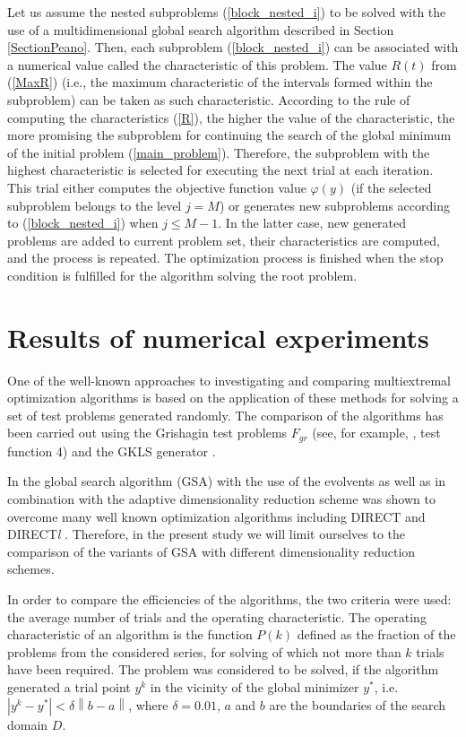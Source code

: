 \documentclass[runningheads]{llncs}
\begin{document}
Let us assume the nested subproblems (\ref{block_nested_i}) to be solved with the use of a multidimensional 
global search algorithm described in Section \ref{SectionPeano}. Then, each subproblem (\ref{block_nested_i}) can be 
associated with a numerical value called the characteristic of this problem. The value $R(t)$ from (\ref{MaxR}) (i.e., the 
maximum characteristic of the intervals formed within the subproblem) can be taken as such characteristic. According to the 
rule of computing the characteristics (\ref{R}), the higher the value of the characteristic, the more promising the 
subproblem for continuing the search of the global minimum of the initial problem (\ref{main_problem}). Therefore, the 
subproblem with the highest characteristic is selected for executing the next trial at each iteration. This trial either 
computes the objective function value $\varphi(y)$ (if the selected subproblem belongs to the level $j=M$) or generates 
new subproblems according to (\ref{block_nested_i}) when $j\leq M-1$. In the latter case, new generated problems are 
added to current problem set, their characteristics are computed, and the process is repeated. The  optimization process is 
finished when the  stop condition is fulfilled for the algorithm solving the root problem.

\section{Results of numerical experiments}

One of the well-known approaches to investigating and comparing multiextremal 
optimization algorithms is based on the application of these methods for 
solving a set of test problems generated randomly.
The comparison of the algorithms has been carried out using the Grishagin test problems $F_{gr}$ (see, for example, \cite{Grishagin1994}, test function 4) and the GKLS generator \cite{Gaviano2003}.

In \cite{Barkalov2015,Grishagin2018} the global search algorithm (GSA) with the use of the evolvents as well as in combination 
with the adaptive dimensionality reduction scheme was shown to overcome many well known optimization 
algorithms including DIRECT \cite{Jones1993} and DIRECT\textit{l} \cite{Gablonsky2001}. Therefore, in the present study we will limit ourselves to the comparison of the  variants of GSA with different dimensionality reduction schemes. 

In order to compare the efficiencies of the algorithms, the two criteria were used: the average number of trials and the 
operating characteristic.
The operating  characteristic of an algorithm is the function $P(k)$ defined as the fraction of the problems from the 
considered series, for solving of which not more than $k$ trials have been required.
The problem was considered to be solved, if the algorithm generated a trial point $y^k$ in the vicinity of 
the global minimizer $y^\ast$, i.e. $\left|y^k-y^\ast\right| < \delta \left\|b-a\right\|$, where $\delta = 0.01$, $a$ and $b$ are the 
boundaries of the search domain $D$.
\end{document}
